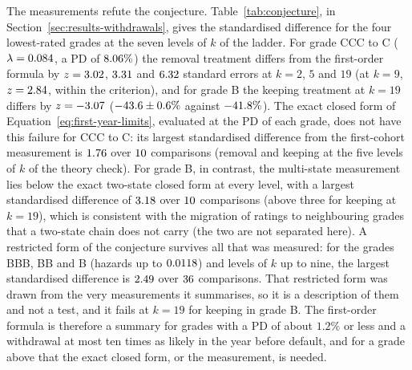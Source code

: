 The measurements refute the conjecture. Table~\ref{tab:conjecture}, in Section~\ref{sec:results-withdrawals}, gives the standardised difference for the four lowest-rated grades at the seven levels of $k$ of the ladder. For grade CCC to C ($\lambda=0.084$, a PD of $8.06\%$) the removal treatment differs from the first-order formula by $z=3.02$, $3.31$ and $6.32$ standard errors at $k=2$, $5$ and $19$ (at $k=9$, $z=2.84$, within the criterion), and for grade B the keeping treatment at $k=19$ differs by $z=-3.07$ ($-43.6\pm0.6\%$ against $-41.8\%$). The exact closed form of Equation~\eqref{eq:first-year-limits}, evaluated at the PD of each grade, does not have this failure for CCC to C: its largest standardised difference from the first-cohort measurement is $1.76$ over $10$ comparisons (removal and keeping at the five levels of $k$ of the theory check). For grade B, in contrast, the multi-state measurement lies below the exact two-state closed form at every level, with a largest standardised difference of $3.18$ over $10$ comparisons (above three for keeping at $k=19$), which is consistent with the migration of ratings to neighbouring grades that a two-state chain does not carry (the two are not separated here). A restricted form of the conjecture survives all that was measured: for the grades BBB, BB and B (hazards up to $0.0118$) and levels of $k$ up to nine, the largest standardised difference is $2.49$ over $36$ comparisons. That restricted form was drawn from the very measurements it summarises, so it is a description of them and not a test, and it fails at $k=19$ for keeping in grade B. The first-order formula is therefore a summary for grades with a PD of about $1.2\%$ or less and a withdrawal at most ten times as likely in the year before default, and for a grade above that the exact closed form, or the measurement, is needed.
